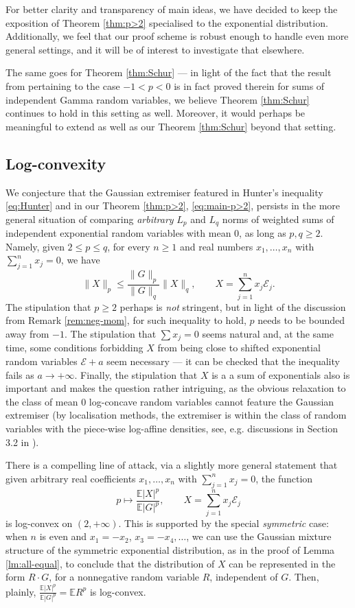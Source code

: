 \documentclass[10pt]{article}
\newcommand{\E}{\mathbb{E}}
\newcommand{\1}{\textbf{1}}
\newcommand{\cE}{\mathscr{E}}
\theoremstyle{remark}
\theoremstyle{definition}
\begin{document}
For better clarity and transparency of main ideas, we have decided to keep the exposition of Theorem \ref{thm:p>2} specialised to the exponential distribution. Additionally, we feel that our proof scheme is robust enough to handle even more general settings, and it will be of interest to investigate that elsewhere.

The same goes for Theorem \ref{thm:Schur} --- in light of the fact that the result from \cite{CST0} pertaining to the case $-1 < p < 0$ is in fact proved therein for sums of independent Gamma random variables, we believe Theorem \ref{thm:Schur} continues to hold in this setting as well. Moreover, it would perhaps be meaningful to extend \cite{CST0} as well as our Theorem \ref{thm:Schur} beyond that setting.



\subsection{Log-convexity}


We conjecture that the Gaussian extremiser featured in Hunter's inequality \eqref{eq:Hunter} and in our Theorem \ref{thm:p>2}, \eqref{eq:main-p>2}, persists in the more general situation of comparing \emph{arbitrary} $L_p$ and $L_q$ norms of weighted sums of independent exponential random variables with mean $0$, as long as $p, q  \geq 2$. Namely, given $2 \leq p \leq q$, for every $n \geq 1$ and real numbers $x_1, \dots, x_n$ with $\sum_{j=1}^n x_j = 0$, we have
\[ 
\|X\|_p \leq \frac{\|G\|_p}{\|G\|_q}\|X\|_q, \qquad X = \sum_{j=1}^n x_j\cE_j.
 \]
The stipulation that $p \geq 2$ perhaps is \emph{not} stringent, but in light of the discussion from Remark \ref{rem:neg-mom},  for such inequality to hold, $p$ needs to be bounded away from $-1$. The stipulation that $\sum x_j = 0$ seems natural and, at the same time, some conditions forbidding $X$ from being close to shifted exponential random variables $\cE + a$ seem necessary --- it can be checked that the inequality fails as $a \to +\infty$. Finally, the stipulation that $X$ is a a sum of exponentials also is important and makes the question rather intriguing, as the obvious relaxation to the class of mean $0$ log-concave random variables cannot feature the Gaussian extremiser (by localisation methods, the extremiser is within the class of random variables with the piece-wise log-affine densities, see, e.g. discussions in Section 3.2 in \cite{MRTT}).

There is a compelling line of attack, via a slightly more general statement that given arbitrary real coefficients $x_1, \dots, x_n$ with $\sum_{j=1}^n x_j = 0$, the function
\[ 
p \mapsto \frac{\E|X|^p}{\E|G|^p}, \qquad X = \sum_{j=1}^n x_j\cE_j
 \]
is log-convex on $(2, +\infty)$. This is supported by the special \emph{symmetric} case: when  $n$ is even and $x_1 = -x_2$, $x_3 = -x_4, \ldots$, we can use the Gaussian mixture structure of the symmetric exponential distribution, as in the proof of Lemma \ref{lm:all-equal}, to conclude that the distribution of $X$ can be represented in the form $R\cdot G$, for a nonnegative random variable $R$, independent of $G$. Then, plainly,
$\frac{\E|X|^p}{\E|G|^p} = \E R^p$
is log-convex.
\end{document}

